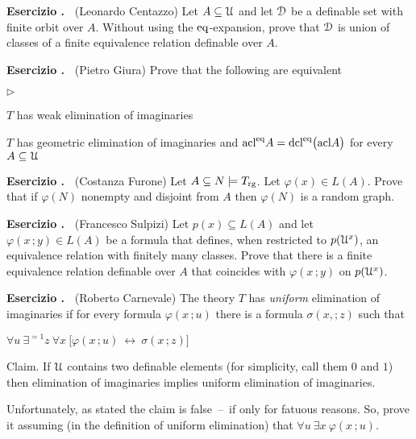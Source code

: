 \documentclass[10pt]{article}
\def\phi{\varphi}
\def\D{\EuScript D}
\def\U{\EuScript U}
\def\E{\exists}
\def\A{\forall}
\def\iff{\leftrightarrow}
\def\acl{\textrm{acl}}
\def\dcl{\textrm{dcl}}
\def\eq{{\rm eq}}
\newcommand{\labella}[1]{{\sf\footnotesize #1}\hfill}
\renewenvironment{itemize}
  {\begin{list}{$\triangleright$}{%
   \setlength{\parskip}{0mm}
   \setlength{\topsep}{0mm}
   \setlength{\rightmargin}{0mm}
   \setlength{\listparindent}{0mm}
   \setlength{\itemindent}{0mm}
   \setlength{\labelwidth}{3ex}
   \setlength{\itemsep}{0mm}
   \setlength{\parsep}{0mm}
   \setlength{\partopsep}{0mm}
   \setlength{\labelsep}{1ex}
   \setlength{\leftmargin}{\labelwidth+\labelsep}
   \let\makelabel\labella}}{%
   \vspace*{-.3\baselineskip}
  \end{list}}
\newcounter{ex}
\newenvironment{exercise}{\bigskip\addtocounter{ex}{1}\textbf{Esercizio \theex.\ }}{}
\begin{document}
\begin{exercise}
  (Leonardo Centazzo)
  Let $A\subseteq\U$ and let $\D$ be a definable set with finite orbit over $A$.
  Without using the $\eq$-expansion, prove that $\D$ is union of classes of a finite equivalence relation definable over $A$.
\end{exercise}

\begin{exercise}
  (Pietro Giura)
    Prove that the following are equivalent
    \begin{itemize}
    \item[1.]  $T$ has weak elimination of imaginaries
    \item[2.]  $T$ has geometric elimination of imaginaries and $\acl^\eq A=\dcl^\eq\big(\acl A\big)$ for every $A\subseteq\U$
    \end{itemize} 
\end{exercise}

\begin{exercise} 
  (Costanza Furone)
  Let $A\subseteq N\models T_{\rm rg}$.
  Let $\phi(x)\in L(A)$.
  Prove that if $\phi(N)$ nonempty and disjoint from $A$ then $\phi(N)$ is a random graph.
\end{exercise}

\begin{exercise} 
  (Francesco Sulpizi)
  Let $p(x)\subseteq L(A)$ and let $\phi(x\,;y)\in L(A)$ be a formula that defines, when restricted to $p(\U^x)$, an equivalence relation with finitely many classes.
  Prove that there is a finite equivalence relation definable over $A$ that coincides with $\phi(x\,;y)$ on $p(\U^x)$.
\end{exercise}

\begin{exercise}
  (Roberto Carnevale)
  The theory $T$ has \textit{uniform\/} elimination of imaginaries if for every formula $\phi(x\,;u)$ there is a formula $\sigma(x,;z)$ such that  

  \hfil  $\A u\ \E^{=1} z\ \A x\ \big[\phi(x\,;u)\ \iff\ \sigma(x\,;z)\big]$

  Claim. If $\U$ contains two definable elements (for simplicity, call them $0$ and $1$) then elimination of imaginaries implies uniform elimination of imaginaries.
  
  Unfortunately, as stated the claim is false~--~if only for fatuous reasons. So, prove it assuming (in the definition of uniform elimination) that $\A u\ \E x\ \phi(x\,;u)$.
\end{exercise}
\end{document}
